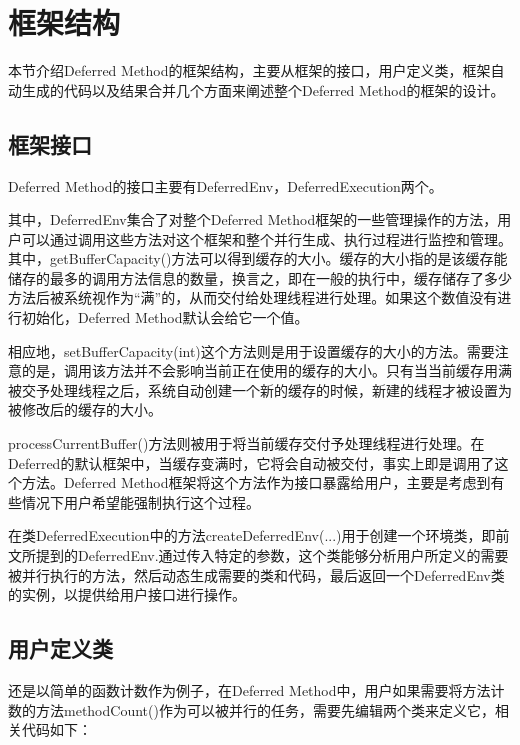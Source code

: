 \section{框架结构}

本节介绍Deferred Method的框架结构，主要从框架的接口，用户定义类，框架自动生成的代码以及结果合并几个方面来阐述整个Deferred Method的框架的设计。

\subsection{框架接口}

Deferred Method的接口主要有DeferredEnv，DeferredExecution两个。


其中，DeferredEnv集合了对整个Deferred Method框架的一些管理操作的方法，用户可以通过调用这些方法对这个框架和整个并行生成、执行过程进行监控和管理。其中，getBufferCapacity()方法可以得到缓存的大小。缓存的大小指的是该缓存能储存的最多的调用方法信息的数量，换言之，即在一般的执行中，缓存储存了多少方法后被系统视作为“满”的，从而交付给处理线程进行处理。如果这个数值没有进行初始化，Deferred Method默认会给它一个值。

相应地，setBufferCapacity(int)这个方法则是用于设置缓存的大小的方法。需要注意的是，调用该方法并不会影响当前正在使用的缓存的大小。只有当当前缓存用满被交予处理线程之后，系统自动创建一个新的缓存的时候，新建的线程才被设置为被修改后的缓存的大小。

processCurrentBuffer()方法则被用于将当前缓存交付予处理线程进行处理。在Deferred的默认框架中，当缓存变满时，它将会自动被交付，事实上即是调用了这个方法。Deferred Method框架将这个方法作为接口暴露给用户，主要是考虑到有些情况下用户希望能强制执行这个过程。

在类DeferredExecution中的方法createDeferredEnv(...)用于创建一个环境类，即前文所提到的DeferredEnv.通过传入特定的参数，这个类能够分析用户所定义的需要被并行执行的方法，然后动态生成需要的类和代码，最后返回一个DeferredEnv类的实例，以提供给用户接口进行操作。

\subsection{用户定义类}

还是以简单的函数计数作为例子，在Deferred Method中，用户如果需要将方法计数的方法methodCount()作为可以被并行的任务，需要先编辑两个类来定义它，相关代码如下：

